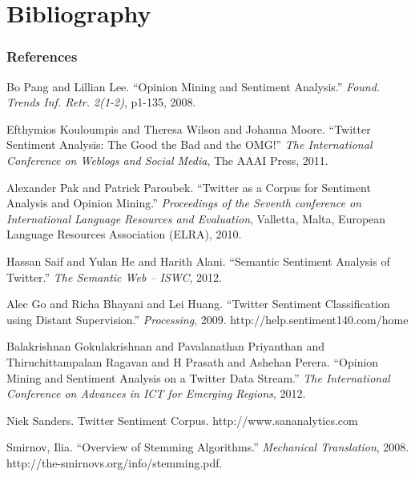 \documentclass{beamer}
\begin{document}
\section*{Bibliography}

\begin{frame}[allowframebreaks]
\frametitle{References}
\footnotesize{
\begin{thebibliography}{99} %


	Bo Pang and Lillian Lee.
	``Opinion Mining and Sentiment Analysis.''
	\textit{Found. Trends Inf. Retr. 2(1-2)}, p1-135, 2008.

	Efthymios Kouloumpis and Theresa Wilson and Johanna Moore.
	``Twitter Sentiment Analysis: The Good the Bad and the OMG!''
	\textit{The International Conference on Weblogs and Social Media}, The AAAI Press, 2011.

	Alexander Pak and Patrick Paroubek.
	``Twitter as a Corpus for Sentiment Analysis and Opinion Mining.''
	\textit{Proceedings of the Seventh conference on International Language Resources and Evaluation},
		Valletta, Malta, European Language Resources Association (ELRA), 2010.

	Hassan Saif and Yulan He and Harith Alani.
	``Semantic Sentiment Analysis of Twitter.''
	\textit{The Semantic Web – ISWC}, 2012.

	Alec Go and Richa Bhayani and Lei Huang.
	``Twitter Sentiment Classification using Distant Supervision.''
	\textit{Processing}, 2009. http://help.sentiment140.com/home

	Balakrishnan Gokulakrishnan and Pavalanathan Priyanthan and Thiruchittampalam Ragavan and H Prasath and Ashehan Perera.
	``Opinion Mining and Sentiment Analysis on a Twitter Data Stream.''
	\textit{The International Conference on Advances in ICT for Emerging Regions}, 2012.

	Niek Sanders. Twitter Sentiment Corpus. http://www.sananalytics.com
	
	Smirnov, Ilia.
	``Overview of Stemming Algorithms.''
	\textit{Mechanical Translation}, 2008.
http://the-smirnovs.org/info/stemming.pdf.


\end{thebibliography}}
\end{frame}
\end{document}
